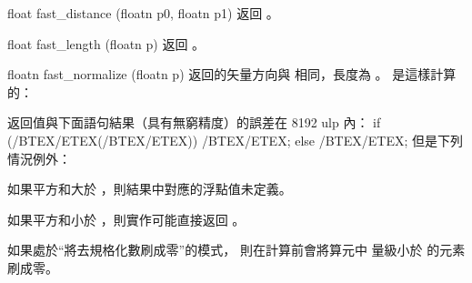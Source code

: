 float fast_distance (floatn p0,
		floatn p1)
\stopbuffer
{}
返回 。
\stopbuffer

float fast_length (floatn p)
\stopbuffer
{}
返回 。
\stopbuffer

floatn fast_normalize (floatn p)
\stopbuffer
{}
返回的矢量方向與  相同，長度為 。
 是這樣計算的：


返回值與下面語句結果（具有無窮精度）的誤差在 8192 ulp 內：
\startcintbl[escape=yes,indentnext=no]
if (/BTEX/ETEX(/BTEX/ETEX))
	/BTEX/ETEX;
else
	/BTEX/ETEX;
\stopcintbl
但是下列情況例外：
\startigNum
\item 如果平方和大於 ，則結果中對應的浮點值未定義。

\item 如果平方和小於 ，則實作可能直接返回 。

\item 如果處於“將去規格化數刷成零”的模式，
則在計算前會將算元中
量級小於  的元素刷成零。
\stopigNum
\stopbuffer
